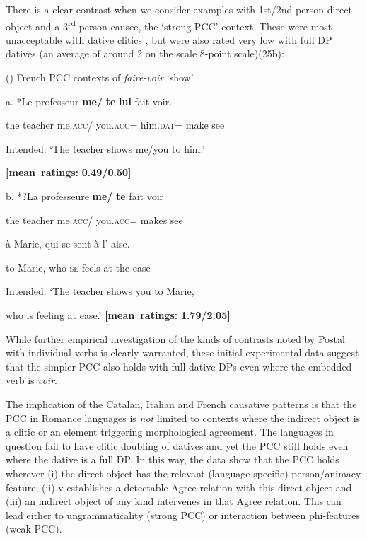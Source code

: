 \documentclass[output=paper,modfonts,nonflat]{langsci/langscibook}
\begin{document}
There is a clear contrast when we consider examples with 1st/2nd person direct object and a 3\textsuperscript{rd} person causee, the ‘strong PCC’ context. These were most unacceptable with dative clitics , but were also rated very low with full DP datives (an average of around 2 on the scale 8-point scale)(25b):

()  French PCC contexts of \textit{faire-voir} ‘show’

  a.   *Le professeur  \textbf{me/}   \textbf{te}       \textbf{lui}   fait   voir. 

    the   teacher  me.\textsc{acc/}  you.\textsc{acc}=  him.\textsc{dat}=  make see

Intended: ‘The teacher shows me/you to him.’

\textbf{[mean~ratings:} \textbf{0.49/0.50]}

  b.   *?La   professeure   \textbf{me/}    \textbf{te}       fait     voir 

    the     teacher     me.\textsc{acc}/  you.\textsc{acc=} makes   see 

à   Marie,  qui   se  sent   à   l’  aise. 

to Marie, who \textsc{se}   feels   at   the ease

Intended: ‘The teacher shows you to Marie, 

who is feeling at ease.’  \textbf{[mean~ratings:} \textbf{1.79/2.05]}

While further empirical investigation of the kinds of contrasts noted by Postal with individual verbs is clearly warranted, these initial experimental data suggest that the simpler PCC also holds with full dative DPs even where the embedded verb is \textit{voir}. 

The implication of the Catalan, Italian and French causative patterns is that the PCC in Romance languages is \textit{not} limited to contexts where the indirect object is a clitic or an element triggering morphological agreement. The languages in question fail to have clitic doubling of datives and yet the PCC still holds even where the dative is a full DP. In this way, the data show that the PCC holds wherever (i) the direct object has the relevant (language-specific) person/animacy feature; (ii) v establishes a detectable Agree relation with this direct object and (iii) an indirect object of any kind intervenes in that Agree relation. This can lead either to ungrammaticality (strong PCC) or interaction between phi-features (weak PCC).  
\end{document}
